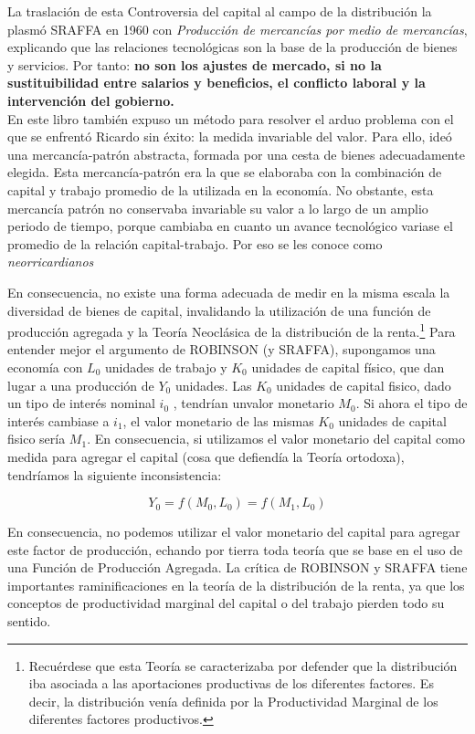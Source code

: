 \documentclass[10pt,a4paper]{article}
\begin{document}
{La traslación de esta Controversia del capital al campo de la distribución la plasmó SRAFFA en 1960 con \textit{Producción de mercancías por medio de mercancías}, explicando que las relaciones tecnológicas son la base de la producción de bienes y servicios. Por tanto: \textbf{no son los ajustes de mercado, si no la sustituibilidad entre salarios y beneficios, el conflicto laboral y la intervención del gobierno.}\\
En este libro también expuso un método para resolver el arduo problema con el que se enfrentó Ricardo sin éxito: la medida invariable del valor. Para ello, ideó una mercancía-patrón abstracta, formada por una cesta de bienes adecuadamente elegida. Esta mercancía-patrón era la que se elaboraba con la combinación de capital y trabajo promedio de la utilizada en la economía. No obstante, esta mercancía patrón no conservaba invariable su valor a lo largo de un amplio periodo de tiempo, porque cambiaba en cuanto un avance tecnológico variase el promedio de la relación capital-trabajo. Por eso se les conoce como \textit{neorricardianos}
}

En consecuencia, no existe una forma adecuada de medir en la misma escala la diversidad de bienes de capital, invalidando la utilización de una función de producción agregada y la Teoría Neoclásica de la distribución de la renta.\footnote{%
    Recuérdese que esta Teoría se caracterizaba por defender que la distribución iba asociada a las aportaciones productivas de los diferentes factores. Es decir, la distribución venía definida por la Productividad Marginal de los diferentes factores productivos.
} Para entender mejor el argumento de ROBINSON (y SRAFFA), supongamos una economía con $L_0$ unidades de trabajo y $K_0$ unidades de capital físico, que dan lugar a una producción de $Y_0$ unidades. Las $K_0$ unidades de capital fisico, dado un tipo de interés nominal $i_0$ , tendrían unvalor monetario $M_0$. Si ahora el tipo de interés cambiase a $i_1$, el valor monetario de las mismas $K_0$ unidades de capital fisico sería $M_1$. En consecuencia, si utilizamos el valor monetario del capital como medida para agregar el capital (cosa que defiendía la Teoría ortodoxa), tendríamos la siguiente inconsistencia: 

$$Y_0=f(M_0,L_0)=f(M_1, L_0)$$

En consecuencia, no podemos utilizar el valor monetario del capital para agregar este factor de producción, echando por tierra toda teoría que se base en el uso de una Función de Producción Agregada. La crítica de ROBINSON y SRAFFA tiene importantes raminificaciones en la teoría de la distribución de la renta, ya que los conceptos de productividad marginal del capital o del trabajo pierden todo su sentido.
\end{document}
